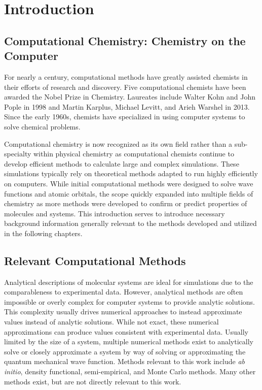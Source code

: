 \chapter{Introduction}
\label{ch:Introduction}

\section{Computational Chemistry: Chemistry on the Computer}

For nearly a century, computational methods have greatly assisted chemists in their efforts of research and discovery.
Five computational chemists have been awarded the Nobel Prize in Chemistry. 
Laureates include Walter Kohn and John Pople in 1998 and Martin Karplus, Michael Levitt, and Arieh Warshel in 2013.
Since the early 1960s, chemists have specialized in using computer systems to solve chemical problems.

Computational chemistry is now recognized as its own field rather than a sub-specialty within physical chemistry as computational chemists continue to develop efficient methods to calculate large and complex simulations.
These simulations typically rely on theoretical methods adapted to run highly efficiently on computers.
While initial computational methods were designed to solve wave functions and atomic orbitals, the scope quickly expanded into multiple fields of chemistry as more methods were developed to confirm or predict properties of molecules and systems.\cite{PopleSTO, GaussianOrbitals,GAMESS}
This introduction serves to introduce necessary background information generally relevant to the methods developed and utilized in the following chapters.

\section{Relevant Computational Methods}

Analytical descriptions of molecular systems are ideal for simulations due to the comparableness to experimental data.
However, analytical methods are often impossible or overly complex for computer systems to provide analytic solutions.
This complexity usually drives numerical approaches to instead approximate values instead of analytic solutions.
While not exact, these numerical approximations can produce values consistent with experimental data.
Usually limited by the size of a system, multiple numerical methods exist to analytically solve or closely approximate a system by way of solving or approximating the quantum mechanical wave function.
Methods relevant to this work include \textit{ab initio}, density functional, semi-empirical, and Monte Carlo methods.
Many other methods exist, but are not directly relevant to this work.

